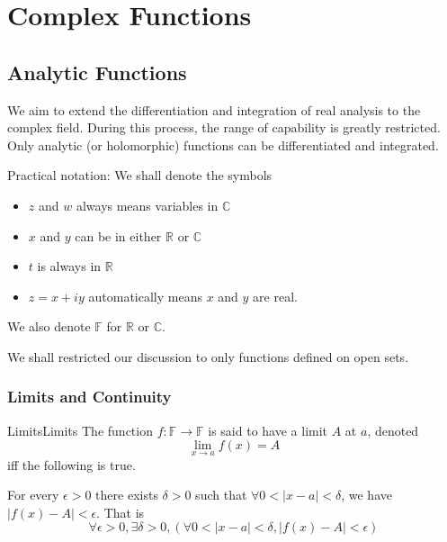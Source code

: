 \documentclass[../main.tex]{subfiles}
\begin{document}
\chapter{Complex Functions}

\section{Analytic Functions}

We aim to extend the differentiation and integration of real analysis to the complex field. During this process, the range of capability is greatly restricted. Only analytic (or holomorphic) functions can be differentiated and integrated.

\begin{plainblackenv}
Practical notation:
\tcblower
We shall denote the symbols 
\begin{itemize}
\item $z$ and $w$ always means variables in $\mathbb{C}$ 
\item $x$ and $y$ can be in either $\mathbb{R}$ or $\mathbb{C}$
\item $t$ is always in $\mathbb{R}$
\item $z=x+iy$ automatically means $x$ and $y$ are real.
\end{itemize}

We also denote $\mathbb{F}$ for $\mathbb{R}$ or $\mathbb{C}$.
\end{plainblackenv}

We shall restricted our discussion to only functions defined on open sets.

\subsection{Limits and Continuity}

\begin{definition}{Limits}{Limits}
The function $f: \mathbb{F}\rightarrow \mathbb{F}$ is said to have a limit $A$ at $a$, denoted
\begin{equation}
\lim_{x \to a} f(x) = A 
\end{equation}
iff the following is true.

For every $\epsilon>0$ there exists $\delta>0$ such that $\forall 0<\left|x-a\right|<\delta$, we have $\left|f(x)-A\right|<\epsilon$. That is
\begin{equation}
\forall \epsilon>0,\exists \delta>0,( \forall 0<\left|x-a\right|<\delta, \left|f(x)-A\right|<\epsilon)
\end{equation}
\end{definition}
\end{document}
